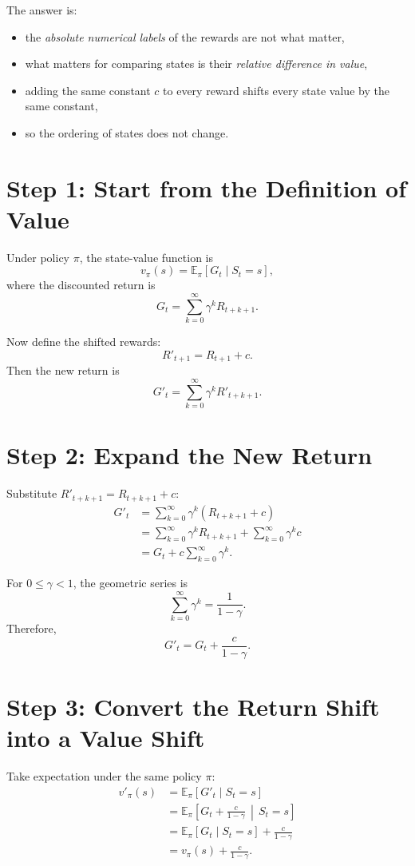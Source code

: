 \documentclass[11pt]{article}
\begin{document}
The answer is:
\begin{itemize}
    \item the \emph{absolute numerical labels} of the rewards are not what matter,
    \item what matters for comparing states is their \emph{relative difference in
    value},
    \item adding the same constant \(c\) to every reward shifts every state value
    by the same constant,
    \item so the ordering of states does not change.
\end{itemize}

\section*{Step 1: Start from the Definition of Value}

Under policy \(\pi\), the state-value function is
\[
    v_\pi(s) = \mathbb{E}_\pi[G_t \mid S_t = s],
\]
where the discounted return is
\[
    G_t = \sum_{k=0}^{\infty} \gamma^k R_{t+k+1}.
\]

Now define the shifted rewards:
\[
    R'_{t+1} = R_{t+1} + c.
\]
Then the new return is
\[
    G'_t = \sum_{k=0}^{\infty} \gamma^k R'_{t+k+1}.
\]

\section*{Step 2: Expand the New Return}

Substitute \(R'_{t+k+1} = R_{t+k+1} + c\):
\[
\begin{aligned}
    G'_t
    &= \sum_{k=0}^{\infty} \gamma^k (R_{t+k+1} + c) \\
    &= \sum_{k=0}^{\infty} \gamma^k R_{t+k+1}
     + \sum_{k=0}^{\infty} \gamma^k c \\
    &= G_t + c \sum_{k=0}^{\infty} \gamma^k.
\end{aligned}
\]

For \(0 \le \gamma < 1\), the geometric series is
\[
    \sum_{k=0}^{\infty} \gamma^k = \frac{1}{1-\gamma}.
\]
Therefore,
\[
    G'_t = G_t + \frac{c}{1-\gamma}.
\]

\section*{Step 3: Convert the Return Shift into a Value Shift}

Take expectation under the same policy \(\pi\):
\[
\begin{aligned}
    v'_\pi(s)
    &= \mathbb{E}_\pi[G'_t \mid S_t = s] \\
    &= \mathbb{E}_\pi\left[G_t + \frac{c}{1-\gamma}\,\middle|\,S_t=s\right] \\
    &= \mathbb{E}_\pi[G_t \mid S_t=s] + \frac{c}{1-\gamma} \\
    &= v_\pi(s) + \frac{c}{1-\gamma}.
\end{aligned}
\]
\end{document}

